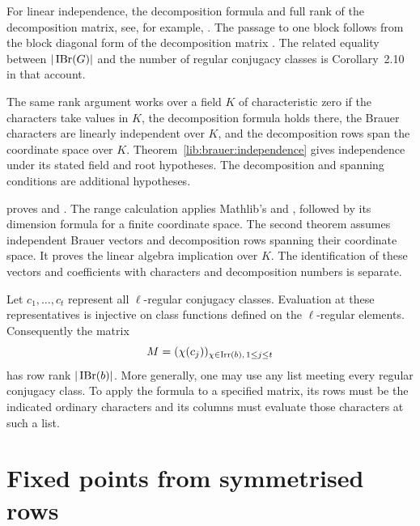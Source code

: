 For linear independence, the decomposition formula and full rank
of the decomposition matrix, see, for example,
\cite[Theorem~2.6 and Corollaries~2.9--2.11]{Navarro1998}.
The passage to one block follows from the block diagonal form of
the decomposition matrix
\cite[Theorem~3.3 and the following discussion]{Navarro1998}.
The related equality between $|\operatorname{IBr}(G)|$ and the number of regular
conjugacy classes is Corollary~2.10 in that account.

The same rank argument works over a field $K$ of characteristic
zero if the characters take values in $K$, the decomposition formula
holds there, the Brauer characters are linearly independent over
$K$, and the decomposition rows span the coordinate space over $K$.
Theorem~\ref{lib:brauer:independence} gives independence under its
stated field and root hypotheses. The decomposition and spanning
conditions are additional hypotheses.

\begin{implementation}
 proves
 and
.
The range calculation applies Mathlib's
 and
, followed by its dimension
formula for a finite coordinate space.
The second theorem assumes independent Brauer vectors and
decomposition rows spanning their coordinate space.
It proves the linear algebra implication over $K$.
The identification of these vectors and coefficients with characters
and decomposition numbers is separate.
\end{implementation}

Let $c_1,\ldots,c_t$ represent all $\ell$-regular conjugacy classes.
Evaluation at these representatives is injective on class functions
defined on the $\ell$-regular elements.
Consequently the matrix
\[
 M=(\chi(c_j))_{\chi\in\operatorname{Irr}(b),\,1\leq j\leq t}
\]
has row rank $|\operatorname{IBr}(b)|$. More generally, one may use any list
meeting every regular conjugacy class. To apply the formula to a
specified matrix, its rows must be the indicated ordinary characters
and its columns must evaluate those characters at such a list.

\section{Fixed points from symmetrised rows}

